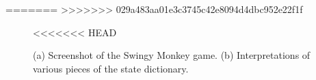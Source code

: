 \documentclass[submit]{../harvardml}
\begin{document}
=======
>>>>>>> 029a483aa01e3c3745c42e8094d4dbc952e22f1f
\begin{figure}[H]
    \centering%
    \hfill
    \caption{(a) Screenshot of the Swingy Monkey game.  (b) Interpretations of various pieces of the state dictionary.}
<<<<<<< HEAD
\end{figure} 
\end{document}
